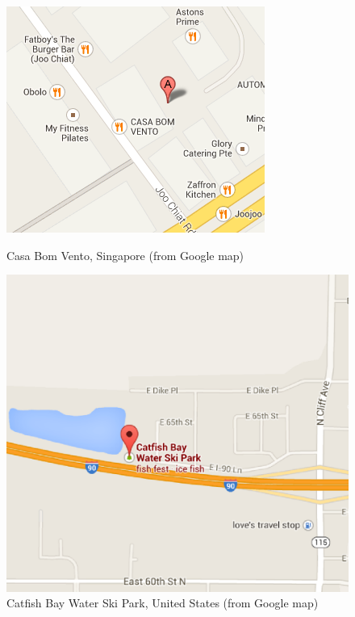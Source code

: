 \begin{figure}[ht]
\begin{minipage}[ht]{0.51\linewidth}
\centering
\includegraphics[width=\columnwidth]{VenueGraph/CasaBomVento.PNG}
\caption{Casa Bom Vento, Singapore (from Google map)}
\label{fig:EgCasa}
\end{minipage}
\hspace{0.5cm}
\begin{minipage}[ht]{0.49\linewidth}
\centering
\includegraphics[width=\columnwidth]{VenueGraph/skipark.eps}
\caption{Catfish Bay Water Ski Park, United States (from Google map)}
\label{fig:skipark}
\end{minipage}
\end{figure}


